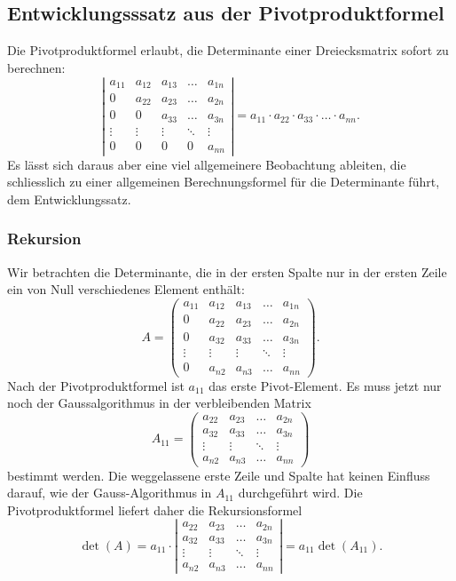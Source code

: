 %
%
%
\subsection{Entwicklungsssatz aus der Pivotproduktformel}
Die Pivotproduktformel erlaubt, die Determinante einer Dreiecksmatrix sofort
zu berechnen:
\[
\left|\begin{matrix}
a_{11}&a_{12}&a_{13}&\dots &a_{1n}\\
  0   &a_{22}&a_{23}&\dots &a_{2n}\\
  0   &  0   &a_{33}&\dots &a_{3n}\\
\vdots&\vdots&\vdots&\ddots&\vdots\\
  0   &  0   &   0  &  0   &a_{nn}
\end{matrix}\right|
=
a_{11}\cdot a_{22}\cdot a_{33}\cdot\dots\cdot a_{nn}.
\]
Es lässt sich daraus aber eine viel allgemeinere Beobachtung ableiten, die
schliesslich zu einer allgemeinen Berechnungsformel für die Determinante
führt, dem Entwicklungssatz.

\subsubsection{Rekursion}
Wir betrachten die Determinante, die in der ersten Spalte nur in der
ersten Zeile ein von Null verschiedenes Element enthält:
\[
A=
\begin{pmatrix}
a_{11}&a_{12}&a_{13}&\dots &a_{1n}\\
  0   &a_{22}&a_{23}&\dots &a_{2n}\\
  0   &a_{32}&a_{33}&\dots &a_{3n}\\
\vdots&\vdots&\vdots&\ddots&\vdots\\
  0   &a_{n2}&a_{n3}&\dots &a_{nn}
\end{pmatrix}.
\]
Nach der Pivotproduktformel ist $a_{11}$ das erste Pivot-Element.
Es muss jetzt nur noch der Gaussalgorithmus in der verbleibenden Matrix
\[
A_{11}
=
\begin{pmatrix}
a_{22}&a_{23}&\dots &a_{2n}\\
a_{32}&a_{33}&\dots &a_{3n}\\
\vdots&\vdots&\ddots&\vdots\\
a_{n2}&a_{n3}&\dots &a_{nn}
\end{pmatrix}
\]
bestimmt werden.
Die weggelassene erste Zeile und Spalte hat keinen Einfluss darauf, wie
der Gauss-Algorithmus in $A_{11}$ durchgeführt wird.
Die Pivotproduktformel liefert daher die Rekursionsformel
\begin{equation}
\det(A)
=
a_{11}\cdot
\left|\begin{matrix}
a_{22}&a_{23}&\dots &a_{2n}\\
a_{32}&a_{33}&\dots &a_{3n}\\
\vdots&\vdots&\ddots&\vdots\\
a_{n2}&a_{n3}&\dots &a_{nn}
\end{matrix} \right|
=
a_{11}
\det(A_{11}).
\label{determinante:entwicklungssatz:rekursion}
\end{equation}

